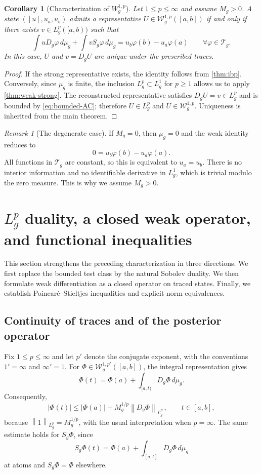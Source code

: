 \documentclass[preprint,12pt]{elsarticle}
\newtheorem{corollary}[theorem]{Corollary}
\theoremstyle{definition}
\theoremstyle{remark}
\newtheorem{remark}[theorem]{Remark}
\newcommand{\mug}{\mu_g}
\newcommand{\norm}[1]{\left\lVert#1\right\rVert}
\newcommand{\abs}[1]{\left\lvert#1\right\rvert}
\begin{document}
\begin{corollary}[Characterization of $W_g^{1,p}$]\label{cor:Wgp-weak}
Let $1\le p\le\infty$ and assume $M_g>0$. A state $([u],u_a,u_b)$ admits a representative $U\in\mathcal W_g^{1,p}([a,b])$ if and only if there exists $v\in L_g^p([a,b))$ such that
\[
 \int uD_g\varphi\,d\mu_g
 +\int vS_g\varphi\,d\mu_g
 =u_b\varphi(b)-u_a\varphi(a)
 \qquad\forall\varphi\in\mathcal T_g.
\]
In this case, $U$ and $v=D_gU$ are unique under the prescribed traces.
\end{corollary}

\begin{proof}
If the strong representative exists, the identity follows from \cref{thm:ibp}. Conversely, since $\mu_g$ is finite, the inclusion $L_g^p\subset L_g^1$ for $p\ge1$ allows us to apply \cref{thm:weak-strong}. The reconstructed representative satisfies $D_gU=v\in L_g^p$ and is bounded by \eqref{eq:bounded-AC}; therefore $U\in L_g^p$ and $U\in\mathcal W_g^{1,p}$. Uniqueness is inherited from the main theorem.
\end{proof}

\begin{remark}[The degenerate case]
If $M_g=0$, then $\mug=0$ and the weak identity reduces to
\[
 0=u_b\varphi(b)-u_a\varphi(a).
\]
All functions in $\mathcal T_g$ are constant, so this is equivalent to $u_a=u_b$. There is no interior information and no identifiable derivative in $L_g^1$, which is trivial modulo the zero measure. This is why we assume $M_g>0$.
\end{remark}

\section{$L_g^p$ duality, a closed weak operator, and functional inequalities}\label{sec:operator}

This section strengthens the preceding characterization in three directions. We first replace the bounded test class by the natural Sobolev duality. We then formulate weak differentiation as a closed operator on traced states. Finally, we establish Poincar\'e--Stieltjes inequalities and explicit norm equivalences.

\subsection{Continuity of traces and of the posterior operator}

Fix $1\le p\le\infty$ and let $p'$ denote the conjugate exponent, with the conventions $1'=\infty$ and $\infty'=1$. For $\Phi\in\mathcal W_g^{1,p'}([a,b])$, the integral representation gives
\[
 \Phi(t)=\Phi(a)+\int_{[a,t)}D_g\Phi\,d\mu_g.
\]
Consequently,
\begin{equation}\label{eq:trace-basic-p}
 \abs{\Phi(t)}
 \le \abs{\Phi(a)}+M_g^{1/p}\norm{D_g\Phi}_{L_g^{p'}},
 \qquad t\in[a,b],
\end{equation}
because $\norm{1}_{L_g^p}=M_g^{1/p}$, with the usual interpretation when $p=\infty$. The same estimate holds for $S_g\Phi$, since
\[
 S_g\Phi(t)=\Phi(a)+\int_{[a,t]}D_g\Phi\,d\mu_g
\]
at atoms and $S_g\Phi=\Phi$ elsewhere.
\end{document}
